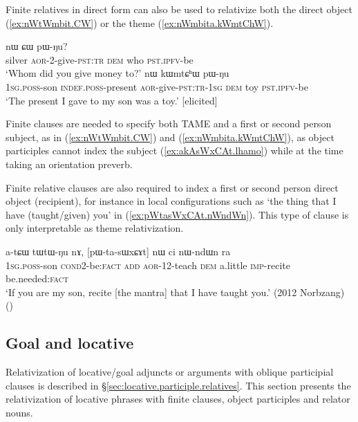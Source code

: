 Finite relatives in direct form can also be used to relativize both the direct object (\ref{ex:nWtWmbit.CW}) or the theme (\ref{ex:nWmbita.kWmtChW}). 

\begin{exe}
\ex 
\begin{xlist}
\ex \label{ex:nWtWmbit.CW}
 nɯ ɕɯ pɯ-ŋu? \\
silver \textsc{aor}-2-give-\textsc{pst}:\textsc{tr} \textsc{dem} who \textsc{pst}.\textsc{ipfv}-be \\
\glt `Whom did you give money to?'
\ex \label{ex:nWmbita.kWmtChW}
 nɯ kɯmtɕʰɯ pɯ-ŋu \\
 \textsc{1sg}.\textsc{poss}-son \textsc{indef}.\textsc{poss}-present \textsc{aor}-give-\textsc{pst}:\textsc{tr}-\textsc{1sg} \textsc{dem} toy \textsc{pst}.\textsc{ipfv}-be \\
 \glt `The present I gave to my son was a toy.' [elicited]
 \end{xlist} 
\end{exe} 

Finite clauses are needed to specify both TAME and a first or second person subject, as in (\ref{ex:nWtWmbit.CW}) and (\ref{ex:nWmbita.kWmtChW}), as object participles cannot index the subject (\ref{ex:akAsWxCAt.lhamo}) while at the time taking an orientation preverb.

Finite relative clauses are also required to index a first or second person direct object (recipient), for instance in local configurations such as  `the thing that I have (taught/given) you' in (\ref{ex:pWtasWxCAt.nWndWn}). This type of clause is only interpretable as theme relativization. 

\begin{exe}
\ex \label{ex:pWtasWxCAt.nWndWn}
\gll  a-tɕɯ tɯ\redp{}tɯ-ŋu nɤ, [pɯ-ta-sɯxɕɤt] nɯ ci nɯ-ndɯn ra \\
\textsc{1sg}.\textsc{poss}-son \textsc{cond}\redp{}2-be:\textsc{fact} \textsc{add} \textsc{aor}-1\fl{}2-teach \textsc{dem} a.little \textsc{imp}-recite be.needed:\textsc{fact} \\
\glt `If you are my son, recite [the mantra] that I have taught you.' (2012 Norbzang)
()
\end{exe} 


\subsection{Goal and locative} \label{sec:locative.relativization}
Relativization of locative/goal adjuncts or arguments with oblique participial clauses  is described in  §\ref{sec:locative.participle.relatives}. This section presents the relativization of locative phrases with finite clauses, object participles and relator nouns.
 

